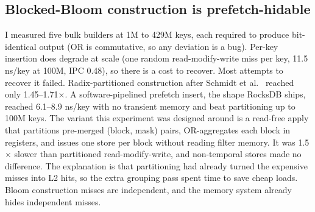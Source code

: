 \documentclass[a4paper,UKenglish,cleveref,autoref,thm-restate,anonymous]{lipics-v2021}
\begin{document}
\subsection{Blocked-Bloom construction is prefetch-hidable}
I measured five bulk builders at 1M to 429M keys, each required to produce bit-identical output (OR is commutative, so any deviation is a bug). Per-key insertion does degrade at scale (one random read-modify-write miss per key, 11.5 ns/key at 100M, IPC 0.48), so there is a cost to recover. Most attempts to recover it failed. Radix-partitioned construction after Schmidt et al.~\cite{schmidt2021partitioned} reached only 1.45--1.71$\times$. A software-pipelined prefetch insert, the shape RocksDB ships, reached 6.1--8.9 ns/key with no transient memory and beat partitioning up to 100M keys. The variant this experiment was designed around is a read-free apply that partitions pre-merged (block, mask) pairs, OR-aggregates each block in registers, and issues one store per block without reading filter memory. It was 1.5$\times$ slower than partitioned read-modify-write, and non-temporal stores made no difference. The explanation is that partitioning had already turned the expensive misses into L2 hits, so the extra grouping pass spent time to save cheap loads. Bloom construction misses are independent, and the memory system already hides independent misses.
\end{document}
